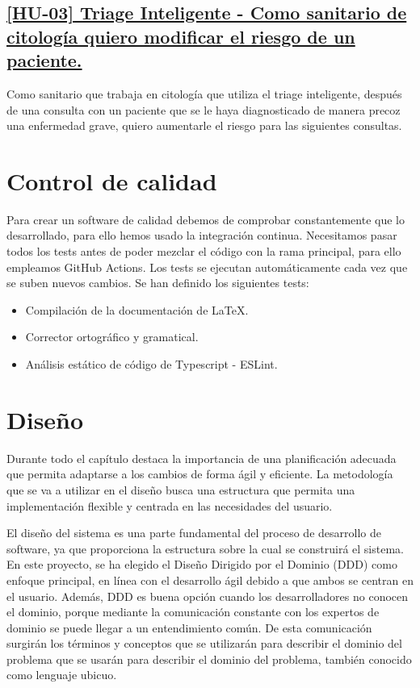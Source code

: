 \subsection*{\href{https://github.com/RubenDelgadoPareja/TFG-Triage-Inteligente-Consulta-Medica/issues/5}{[HU-03] Triage Inteligente - Como sanitario de citología quiero modificar el riesgo de un paciente.}}
Como sanitario que trabaja en citología que utiliza el triage inteligente, después de una consulta con un paciente que se le haya diagnosticado de manera precoz una enfermedad grave,
quiero aumentarle el riesgo para las siguientes consultas.

\section{Control de calidad}
Para crear un software de calidad debemos de comprobar constantemente que lo desarrollado, para ello hemos usado la integración continua.
Necesitamos pasar todos los tests antes de poder mezclar el código con la rama principal, para ello empleamos GitHub Actions.
Los tests se ejecutan automáticamente cada vez que se suben nuevos cambios. Se han definido los siguientes tests:

\begin{itemize}
    \item{Compilación de la documentación de LaTeX.}
    \item{Corrector ortográfico y gramatical.}
    \item{Análisis estático de código de Typescript - ESLint.}
\end{itemize}

\section{Diseño}
Durante todo el capítulo destaca la importancia de una planificación adecuada que permita adaptarse a los cambios de forma ágil y eficiente.
La metodología que se va a utilizar en el diseño busca una estructura que permita una implementación flexible y centrada en las necesidades del usuario.

El diseño del sistema es una parte fundamental del proceso de desarrollo de software, ya que proporciona la estructura sobre la cual se construirá el sistema.
En este proyecto, se ha elegido el Diseño Dirigido por el Dominio (DDD) \cite{domain-drive-design} como enfoque principal, en línea con el desarrollo ágil debido a que ambos se centran en el usuario.
Además, DDD es buena opción cuando los desarrolladores no conocen el dominio, porque mediante la comunicación constante con los expertos de dominio se puede llegar a un entendimiento común.
De esta comunicación surgirán los términos y conceptos que se utilizarán para describir el dominio del problema que se usarán para describir el dominio del problema, también conocido como lenguaje ubicuo.

